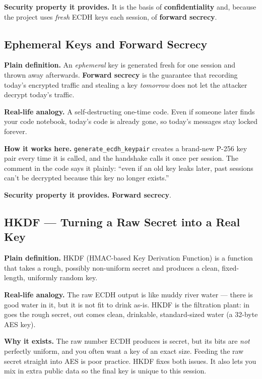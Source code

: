 \documentclass[11pt,a4paper]{report}
\begin{document}
\textbf{Security property it provides.} It is the basis of
\textbf{confidentiality} and, because the project uses \emph{fresh} ECDH keys
each session, of \textbf{forward secrecy}.

\subsection{Ephemeral Keys and Forward Secrecy}
\textbf{Plain definition.} An \emph{ephemeral} key is generated fresh for one
session and thrown away afterwards. \textbf{Forward secrecy} is the guarantee
that recording today's encrypted traffic and stealing a key \emph{tomorrow} does
not let the attacker decrypt today's traffic.

\textbf{Real-life analogy.} A self-destructing one-time code. Even if someone
later finds your code notebook, today's code is already gone, so today's messages
stay locked forever.

\textbf{How it works here.} \texttt{generate\_ecdh\_keypair} creates a brand-new
P-256 key pair every time it is called, and the handshake calls it once per
session. The comment in the code says it plainly: ``even if an old key leaks
later, past sessions can't be decrypted because this key no longer exists.''

\textbf{Security property it provides.} \textbf{Forward secrecy}.

\subsection{HKDF --- Turning a Raw Secret into a Real Key}
\textbf{Plain definition.} HKDF (HMAC-based Key Derivation Function) is a
function that takes a rough, possibly non-uniform secret and produces a clean,
fixed-length, uniformly random key.

\textbf{Real-life analogy.} The raw ECDH output is like muddy river water ---
there is good water in it, but it is not fit to drink as-is. HKDF is the
filtration plant: in goes the rough secret, out comes clean, drinkable,
standard-sized water (a 32-byte AES key).

\textbf{Why it exists.} The raw number ECDH produces is secret, but its bits are
\emph{not} perfectly uniform, and you often want a key of an exact size. Feeding
the raw secret straight into AES is poor practice. HKDF fixes both issues. It
also lets you mix in extra public data so the final key is unique to this
session.
\end{document}
